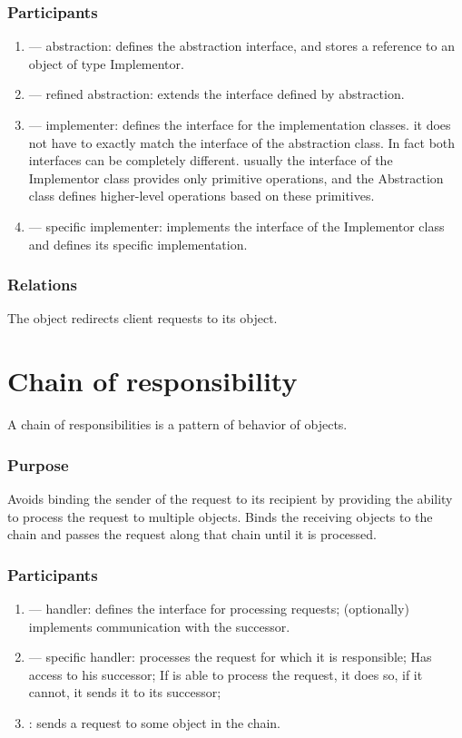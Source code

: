 \documentclass[12pt]{book}
\begin{document}
{{\subsubsection{Participants}
\begin{enumerate}
    \item {} — abstraction: defines the abstraction interface, and stores a reference to an object of type Implementor.
    \item {} —  refined abstraction: extends the interface defined by abstraction.
    \item {} — implementer: defines the interface for the implementation classes. it does not have to exactly match the interface of the abstraction class. In fact both interfaces can be completely different. usually the interface of the Implementor class provides only primitive operations, and the  Abstraction class defines higher-level operations based on these primitives.
    \item {} —  specific implementer: implements the interface of the Implementor class and defines its specific implementation.
\end{enumerate}

\subsubsection{Relations}
The  object redirects client requests to its   object.

\section{Chain of responsibility}
A chain of responsibilities is a pattern of behavior of objects.

\subsubsection{Purpose}
Avoids binding the sender of the request to its recipient by providing the ability to process the request to multiple objects. Binds the receiving objects to the chain and passes the request along that chain until it is processed.



\subsubsection{Participants}
\begin{enumerate}
    \item {} —  handler: defines the interface for processing requests; (optionally) implements communication with the successor.
    \item {} — specific handler: processes the request for which it is responsible; Has access to his successor; If   is able to process the request, it does so, if it cannot, it sends it to its successor;
    \item {}: sends a request to some  object in the chain.
\end{enumerate}

}}
\end{document}
